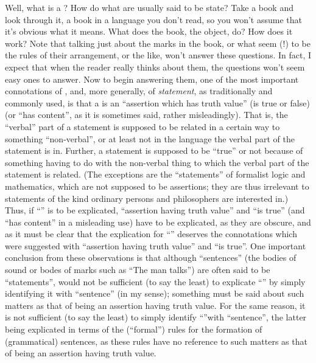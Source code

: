 Well, what is a ? How do what are usually said to be  state? Take a book and look through it, a book in a language you don't read, so you won't assume that it's obvious what it means. What does the book, the object, do? How does it work? Note that talking just about the marks in the book, or what seem (!) to be the rules of their arrangement, or the like, won't answer these questions. In fact, I expect that when the reader really thinks about them, the questions won't seem easy ones to answer. Now to begin answering them, one of the most important connotations of , and, more generally, of \emph{statement}, as traditionally and commonly used, is that a  is an \enquote{assertion which has truth value} (is true or false) (or \enquote{has content}, as it is sometimes said, rather misleadingly). That is, the \enquote{verbal} part of a statement is supposed to be related in a certain way to something \enquote{non-verbal}, or at least not in the language the verbal part of the statement is in. Further, a statement is supposed to be \enquote{true} or not because of something having to do with the non-verbal thing to which the verbal part of the statement is related. (The exceptions are the \enquote{statements} of formalist logic and mathematics, which are not supposed to be assertions; they are thus irrelevant to statements of the kind ordinary persons and philosophers are interested in.) Thus, if \enquote{} is to be explicated, \enquote{assertion having truth value} and \enquote{is true} (and \enquote{has content} in a misleading use) have to be explicated, as they are obscure, and as it must be clear that the explication for \enquote{} deserves the connotations which were suggested with \enquote{assertion having truth value} and \enquote{is true}. One important conclusion from these observations is that although \enquote{sentences} (the bodies of sound or bodes of marks such as \enquote{The man talks}) are often said to be \enquote{statements}, would not be sufficient (to say the least) to explicate \enquote{} by simply identifying it with \enquote{sentence} (in my sense); something must be said about such matters as that of being an assertion having truth value. For the same reason, it is not sufficient (to say the least) to simply identify \enquote{}with \enquote{sentence}, the latter being explicated in terms of the (\enquote{formal}) rules for the formation of (grammatical) sentences, as these rules have no reference to such matters as that of being an assertion having truth value. 

